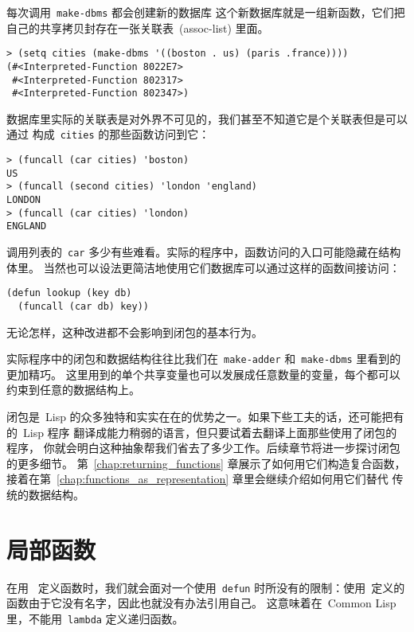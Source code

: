 每次调用~\texttt{make-dbms} 都会创建新的数据库\pozhehao{}
这个新数据库就是一组新函数，它们把自己的共享拷贝封存在一张关联表~(assoc-list) 里面。
\begin{lstlisting}
> (setq cities (make-dbms '((boston . us) (paris .france))))
(#<Interpreted-Function 8022E7>
 #<Interpreted-Function 802317>
 #<Interpreted-Function 802347>)
\end{lstlisting}
数据库里实际的关联表是对外界不可见的，我们甚至不知道它是个关联表\pozhehao{}但是可以通过
构成~\texttt{cities} 的那些函数访问到它：
\begin{lstlisting}
> (funcall (car cities) 'boston)
US
> (funcall (second cities) 'london 'england)
LONDON
> (funcall (car cities) 'london)
ENGLAND
\end{lstlisting}
调用列表的~\texttt{car} 多少有些难看。实际的程序中，函数访问的入口可能隐藏在结构体里。
当然也可以设法更简洁地使用它们\pozhehao{}数据库可以通过这样的函数间接访问：
\begin{lstlisting}
(defun lookup (key db)
  (funcall (car db) key))
\end{lstlisting}
无论怎样，这种改进都不会影响到闭包的基本行为。

实际程序中的闭包和数据结构往往比我们在~\texttt{make-adder} 和~\texttt{make-dbms}
里看到的更加精巧。
这里用到的单个共享变量也可以发展成任意数量的变量，每个都可以约束到任意的数据结构上。

闭包是~Lisp 的众多独特和实实在在的优势之一。如果下些工夫的话，还可能把有的~Lisp 程序
翻译成能力稍弱的语言，但只要试着去翻译上面那些使用了闭包的程序，
你就会明白这种抽象帮我们省去了多少工作。后续章节将进一步探讨闭包的更多细节。
第~\ref{chap:returning_functions} 章展示了如何用它们构造复合函数，
接着在第~\ref{chap:functions_as_representation} 章里会继续介绍如何用它们替代
传统的数据结构。

\section{局部函数}
\label{sec:local_functions}

在用~\lexpr{} 定义函数时，我们就会面对一个使用~\texttt{defun}
时所没有的限制：使用~\lexpr 定义的函数由于它没有名字，因此也就没有办法引用自己。
这意味着在~Common Lisp 里，不能用~\texttt{lambda} 定义递归函数。

